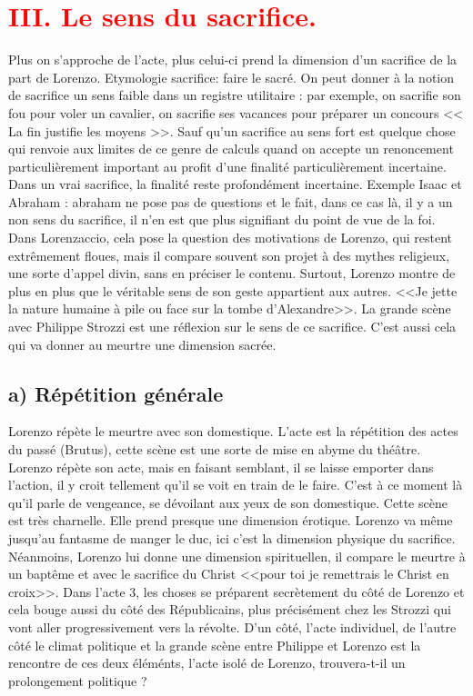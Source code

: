 \documentclass[12pt]{article}
\begin{document}
\section*{\textcolor{red}{III. Le sens du sacrifice.}}
Plus on s'approche de l'acte, plus celui-ci prend la dimension d'un sacrifice de la part de Lorenzo.
Etymologie sacrifice: faire le sacré. On peut donner à la notion de sacrifice un sens faible dans un registre utilitaire : par exemple, on sacrifie son fou pour voler un cavalier, on sacrifie ses vacances pour préparer un concours << La fin justifie les moyens >>.
Sauf qu'un sacrifice au sens fort est quelque chose qui renvoie aux limites de ce genre de calculs quand on accepte un renoncement particulièrement important au profit d'une finalité particulièrement incertaine.
Dans un vrai sacrifice, la finalité reste profondément incertaine.
Exemple Isaac et Abraham : abraham ne pose pas de questions et le fait, dans ce cas là, il y a un non sens du sacrifice, il n'en est que plus signifiant du point de vue de la foi.
Dans Lorenzaccio, cela pose la question des motivations de Lorenzo,  qui restent extrêmement floues, mais il compare souvent son projet à des mythes religieux, une sorte d'appel divin, sans en préciser le contenu.
Surtout, Lorenzo montre de plus en plus que le véritable sens de son geste appartient aux autres. <<Je jette la nature humaine à pile ou face sur la tombe d'Alexandre>>.
La grande scène avec Philippe Strozzi est une réflexion sur le sens de ce sacrifice.
C'est aussi cela qui va donner au meurtre une dimension sacrée.
\subsection*{a) Répétition générale}
Lorenzo répète le meurtre avec son domestique.
L'acte est la répétition des actes du passé (Brutus), cette scène est une sorte de mise en abyme du théâtre.
Lorenzo répète son acte, mais en faisant semblant, il se laisse emporter dans l'action, il y croit tellement qu'il se voit en train de le faire.
C'est à ce moment là qu'il parle de vengeance, se dévoilant aux yeux de son domestique. Cette scène est très charnelle.
Elle prend presque une dimension érotique.
Lorenzo va même jusqu'au fantasme de manger le duc, ici c'est la dimension physique du sacrifice.
Néanmoins, Lorenzo lui donne une dimension spirituellen, il compare le meurtre à un baptême et avec le sacrifice du Christ <<pour toi je remettrais le Christ en croix>>.
Dans l'acte 3, les choses se préparent secrètement du côté de Lorenzo et cela bouge aussi du côté des Républicains, plus précisément chez les Strozzi qui vont aller progressivement vers la révolte.
D'un côté, l'acte individuel, de l'autre côté le climat politique et la grande scène entre Philippe et Lorenzo est la rencontre de ces deux éléménts, l'acte isolé de Lorenzo, trouvera-t-il un prolongement politique ?
\end{document}
